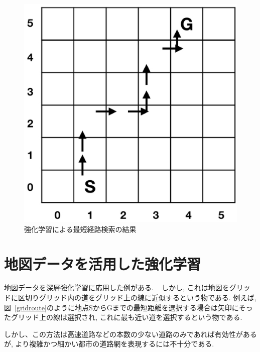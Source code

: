 \begin{figure}[H]
    \centering  %
    \includegraphics[clip,width = 13.0cm]{assets/rein_simple.eps}
    \caption{強化学習による最短経路検索の結果}  \label{ShortenRouteML}
\end{figure}
  


\section{地図データを活用した強化学習}

地図データを深層強化学習に応用した例がある. ~\cite{github1} しかし, これは地図をグリッドに区切りグリッド内の道をグリッド上の線に近似するという物である.
例えば, 図~\ref{gridroute}のように地点SからGまでの最短距離を選択する場合は矢印にそったグリッド上の線は選択され, これに最も近い道を選択するという物である.

しかし、この方法は高速道路などの本数の少ない道路のみであれば有効性があるが, より複雑かつ細かい都市の道路網を表現するには不十分である.

